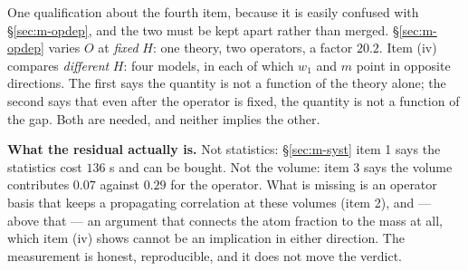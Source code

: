 One qualification about the fourth item, because it is easily confused with \S\ref{sec:m-opdep}, and
the two must be kept apart rather than merged. \S\ref{sec:m-opdep} varies $O$ at \emph{fixed} $H$:
one theory, two operators, a factor $20.2$. Item (iv) compares \emph{different} $H$: four models, in
each of which $w_1$ and $m$ point in opposite directions. The first says the quantity is not a
function of the theory alone; the second says that even after the operator is fixed, the quantity is
not a function of the gap. Both are needed, and neither implies the other.

\medskip
\noindent\textbf{What the residual actually is.} Not statistics: \S\ref{sec:m-syst} item 1 says the
statistics cost $136$ s and can be bought. Not the volume: item 3 says the volume contributes $0.07$
against $0.29$ for the operator. What is missing is an operator basis that keeps a propagating
correlation at these volumes (item 2), and --- above that --- an argument that connects the atom
fraction to the mass at all, which item (iv) shows cannot be an implication in either direction. The
measurement is honest, reproducible, and it does not move the verdict.
